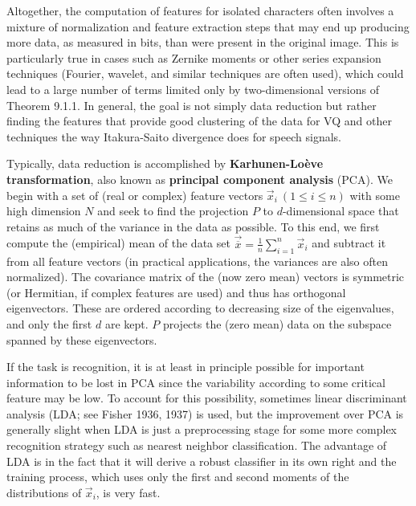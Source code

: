 Altogether, the computation of features for isolated characters often involves
a mixture of normalization and feature extraction steps that may end up
producing more data, as measured in bits, than were present in the original
image. This is particularly true in cases such as Zernike moments or other
series expansion techniques (Fourier, wavelet, and similar techniques are
often used), which could lead to a large number of terms limited only by
two-dimensional versions of Theorem 9.1.1. In general, the goal is not simply
data reduction but rather finding the features that provide good clustering of
the data for VQ and other techniques the way Itakura-Saito divergence does for
speech signals.

Typically, data reduction is accomplished by {\bf Karhunen-Lo\`{e}ve
  transformation}, also known as {\bf principal component analysis}
(PCA). We begin with a set of (real or complex)
feature vectors $\vec{x}_i \ (1\leq i \leq n)$ with some high dimension $N$
and seek to find the projection $P$ to $d$-dimensional space that retains as
much of the variance in the data as possible. To this end, we first compute
the (empirical) mean of the data set
$\vec{\overline{x}}=\frac{1}{n}\sum_{i=1}^n \vec{x}_i$ and subtract it from
all feature vectors (in practical applications, the variances are also often
normalized). The covariance matrix of the (now zero mean) vectors is symmetric
(or Hermitian, if complex features are used) and thus has orthogonal
eigenvectors. These are ordered according to decreasing size of the
eigenvalues, and only the first $d$ are kept. $P$ projects the (zero mean)
data on the subspace spanned by these eigenvectors.

If the task is recognition, it is at least in principle possible for important
information to be lost in PCA since the variability according to some critical
feature may be low. To account for this possibility, sometimes linear
discriminant analysis (LDA; see
Fisher 1936, 1937)\nocite{Fisher:1936}\nocite{Fisher:1937} is used, but the
improvement over PCA is generally slight when LDA is just a preprocessing
stage for some more complex recognition strategy such as nearest neighbor
classification. The advantage of LDA is in the fact that it will derive a
robust classifier in its own right and the training process, which uses only
the first and second moments of the distributions of $\vec{x}_i$, is very
fast.

